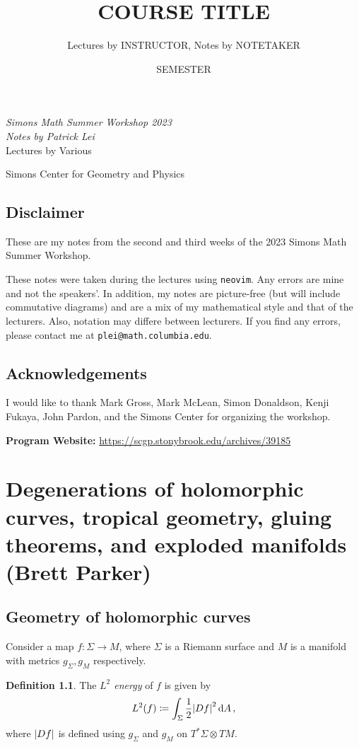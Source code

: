 \documentclass[leqno, openany]{memoir}
\title{COURSE TITLE}
\author{Lectures by INSTRUCTOR, Notes by NOTETAKER}
\date{SEMESTER}
\theoremstyle{definition}
\newtheorem{defn}[thm]{Definition}
\theoremstyle{remark}
\theoremstyle{plain}
\theoremstyle{definition}
\theoremstyle{remark}
\newcommand*{\titleSW}
    {\begingroup%
    \raggedleft
    \vspace*{\baselineskip}
    {\Huge\itshape Simons Math Summer Workshop 2023}\\[\baselineskip]
    {\large\itshape Notes by Patrick Lei}\\[0.2\textheight]
    {\Large Lectures by Various}\par
    \vfill
    {\Large \sffamily Simons Center for Geometry and Physics}
    \vspace*{\baselineskip}
\endgroup}
\begin{document}
    
\begin{titlingpage}
\titleSW
\end{titlingpage}

\thispagestyle{empty}
\section*{Disclaimer}%
\label{sec:disclaimer}

These are my notes from the second and third weeks of the 2023 Simons Math Summer Workshop.

These notes were taken during the lectures using \texttt{neovim}. 
Any errors are mine and not the speakers'. 
In addition, my notes are picture-free (but will include commutative diagrams) and are a mix of my mathematical style and that of the lecturers. Also, notation may differe between lecturers.
If you find any errors, please contact me at \texttt{plei@math.columbia.edu}.

\section*{Acknowledgements}

I would like to thank Mark Gross, Mark McLean, Simon Donaldson, Kenji Fukaya, John Pardon, and the Simons Center for organizing the workshop.

\vspace*{1cm}

\noindent\textbf{Program Website:}  \url{https://scgp.stonybrook.edu/archives/39185}
\newpage

\tableofcontents

\chapter{Degenerations of holomorphic curves, tropical geometry, gluing theorems, and exploded manifolds (Brett Parker)}%
\label{cha:parker}

\section{Geometry of holomorphic curves}

Consider a map $f \colon \Sigma \to M$, where $\Sigma$ is a Riemann surface and $M$ is a manifold with metrics $g_{\Sigma}, g_M$ respectively.

\begin{defn}
    The \textit{$L^2$ energy} of $f$ is given by
    \[ L^2(f) \coloneqq \int_{\Sigma} \frac{1}{2} \abs{Df}^2 \dd{A}, \]
    where $\abs{Df}$ is defined using $g_{\Sigma}$ and $g_M$ on $T^*\Sigma \otimes TM$.
\end{defn}
\end{document}

